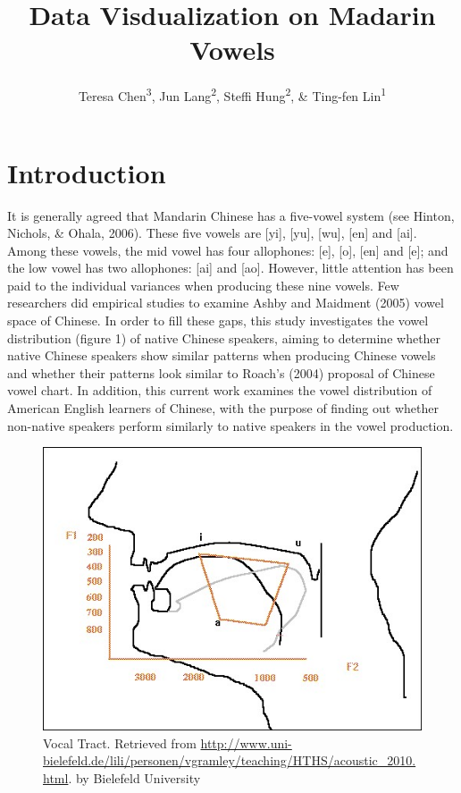 \documentclass[man, fleqn, noextraspace]{apa6}
\title{Data Visdualization on Madarin Vowels}
\author{Teresa Chen\textsuperscript{3}, Jun Lang\textsuperscript{2}, Steffi
Hung\textsuperscript{2}, \& Ting-fen Lin\textsuperscript{1}}
\date{}
\affiliation{
\vspace{0.5cm}
\textsuperscript{1} Department of Human Physiology\\\textsuperscript{2} Department of East Asian Languages \& Linguistics\\\textsuperscript{3} Communication Disorders \& Sciences}
\begin{document}
\maketitle

{
\setcounter{tocdepth}{5}
\tableofcontents
}
\newpage

\section{Introduction}\label{introduction}

It is generally agreed that Mandarin Chinese has a five-vowel system
(see Hinton, Nichols, \& Ohala, 2006). These five vowels are {[}yi{]},
{[}yu{]}, {[}wu{]}, {[}en{]} and {[}ai{]}. Among these vowels, the mid
vowel has four allophones: {[}e{]}, {[}o{]}, {[}en{]} and {[}e{]}; and
the low vowel has two allophones: {[}ai{]} and {[}ao{]}. However, little
attention has been paid to the individual variances when producing these
nine vowels. Few researchers did empirical studies to examine Ashby and
Maidment (2005) vowel space of Chinese. In order to fill these gaps,
this study investigates the vowel distribution (figure 1) of native
Chinese speakers, aiming to determine whether native Chinese speakers
show similar patterns when producing Chinese vowels and whether their
patterns look similar to Roach's (2004) proposal of Chinese vowel chart.
In addition, this current work examines the vowel distribution of
American English learners of Chinese, with the purpose of finding out
whether non-native speakers perform similarly to native speakers in the
vowel production.

\begin{figure}
\centering
\includegraphics{picture/mouth.jpg}
\caption{Vocal Tract. Retrieved from
\url{http://www.uni-bielefeld.de/lili/personen/vgramley/teaching/HTHS/acoustic_2010.html}.
by Bielefeld University}
\end{figure}
\end{document}
